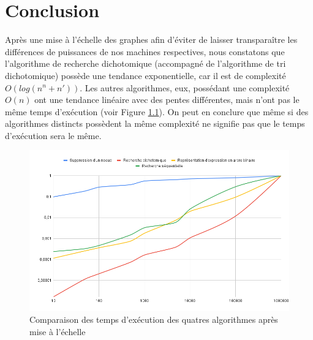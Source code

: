 \chapter{Conclusion}

Après une mise à l'échelle des graphes afin d'éviter de laisser transparaître les différences de puissances de nos machines respectives, nous constatons que l'algorithme de recherche dichotomique (accompagné de l'algorithme de tri dichotomique) possède une tendance exponentielle, car il est de complexité $O(log(n^n + n'))$. Les autres algorithmes, eux, possédant une complexité $O(n)$ ont une tendance linéaire avec des pentes différentes, mais n’ont pas le même temps d'exécution (voir Figure \ref{fig:fig_conclusion}). On peut en conclure que même si des algorithmes distincts possèdent la même complexité ne signifie pas que le temps d'exécution sera le même.

\begin{figure}[H]
    \centering
        \includegraphics[scale=0.5]{./ressources/chartee.png}
        \caption{Comparaison des temps d'exécution des quatres algorithmes après mise à l'échelle}
    \label{fig:fig_conclusion}
\end{figure}
